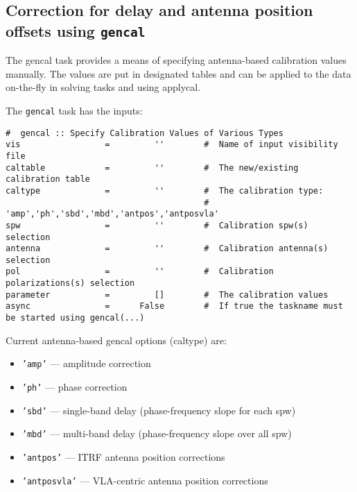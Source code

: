 \subsection{Correction for delay and antenna position offsets 
   using {\tt gencal}}
\label{section:cal.prior.gencal}


The gencal task provides a means of specifying antenna-based
calibration values manually.  The values are put in designated tables
and can be applied to the data on-the-fly in solving tasks and 
using applycal.

The {\tt gencal} task has the inputs:
\small
\begin{verbatim}
#  gencal :: Specify Calibration Values of Various Types
vis                 =         ''        #  Name of input visibility file
caltable            =         ''        #  The new/existing calibration table
caltype             =         ''        #  The calibration type:
                                        #   'amp','ph','sbd','mbd','antpos','antposvla'
spw                 =         ''        #  Calibration spw(s) selection
antenna             =         ''        #  Calibration antenna(s) selection
pol                 =         ''        #  Calibration polarizations(s) selection
parameter           =         []        #  The calibration values
async               =      False        #  If true the taskname must be started using gencal(...)
\end{verbatim}
\normalsize


Current antenna-based gencal options (caltype) are:
\begin{itemize}
   \item {\tt 'amp'} --- amplitude correction
   \item {\tt 'ph'} --- phase correction
   \item {\tt 'sbd'} --- single-band delay (phase-frequency slope for each spw)
   \item {\tt 'mbd'} --- multi-band delay (phase-frequency slope over all spw)
   \item {\tt 'antpos'} --- ITRF antenna position corrections
   \item {\tt 'antposvla'} --- VLA-centric antenna position corrections 
\end{itemize}

